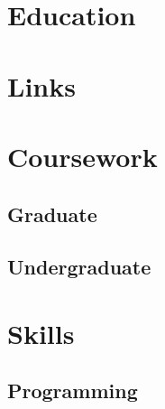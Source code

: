 \documentclass[]{deedy-resume-openfont}
\begin{document}
\lastupdated



\begin{minipage}[t]{0.33\textwidth} 


\section{Education} 
\subsection{  }
\descript{  }
\location{  |  }


\sectionsep


\section{Links} 








\section{Coursework}
\subsection{Graduate}
\sectionsep

\subsection{Undergraduate}
\sectionsep


\section{Skills}
\subsection{Programming}
\\
\\
\sectionsep

\end{minipage} 
\end{document}
